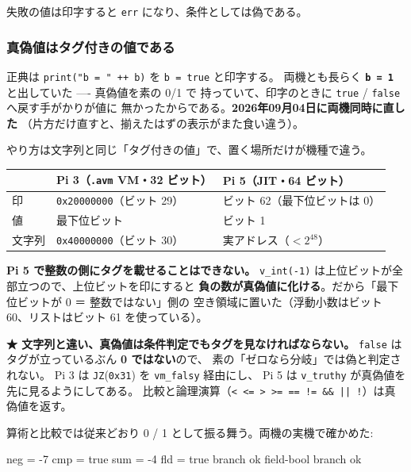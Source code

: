 \documentclass[11pt,a4paper]{ltjsarticle}
\begin{document}
失敗の値は印字すると \texttt{err} になり、条件としては偽である。

\subsubsection*{真偽値はタグ付きの値である}
\label{sec:bool-tag}

正典は \texttt{print("b = " ++ b)} を \texttt{b = true} と印字する。
両機とも長らく \textbf{\texttt{b = 1}} と出していた ---- 真偽値を素の 0/1 で
持っていて、印字のときに \texttt{true} / \texttt{false} へ戻す手がかりが値に
無かったからである。\textbf{2026年09月04日に両機同時に直した}
（片方だけ直すと、揃えたはずの表示がまた食い違う）。

やり方は文字列と同じ「タグ付きの値」で、置く場所だけが機種で違う。

\begin{center}
\small
\begin{tabular}{@{}lll@{}}
\toprule
 & Pi 3（\texttt{.avm} VM・32 ビット） & Pi 5（JIT・64 ビット） \\
\midrule
印 & \texttt{0x20000000}（ビット 29） & ビット 62（最下位ビットは 0） \\
値 & 最下位ビット & ビット 1 \\
文字列 & \texttt{0x40000000}（ビット 30） & 実アドレス（$< 2^{48}$） \\
\bottomrule
\end{tabular}
\end{center}

\textbf{Pi 5 で整数の側にタグを載せることはできない。}
\texttt{v\_int(-1)} は上位ビットが全部立つので、上位ビットを印にすると
\textbf{負の数が真偽値に化ける}。だから「最下位ビットが 0 ＝ 整数ではない」側の
空き領域に置いた（浮動小数はビット 60、リストはビット 61 を使っている）。

\textbf{★ 文字列と違い、真偽値は条件判定でもタグを見なければならない。}
\texttt{false} はタグが立っているぶん \textbf{0 ではない}ので、
素の「ゼロなら分岐」では偽と判定されない。
Pi 3 は \texttt{JZ}(\texttt{0x31}) を \texttt{vm\_falsy} 経由にし、
Pi 5 は \texttt{v\_truthy} が真偽値を先に見るようにしてある。
比較と論理演算（\texttt{< <= > >= == != \&\& || !}）は真偽値を返す。

算術と比較では従来どおり 0 / 1 として振る舞う。両機の実機で確かめた:

\begin{term}
neg = -7        cmp = true      sum = -4      fld = true
branch ok       field-bool branch ok
\end{term}
\end{document}
